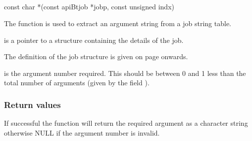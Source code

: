 \subsection{\funcnameXBgetarg{}}

\begin{expara}

const char *\funcnameXBgetarg{}(const apiBtjob *jobp, const unsigned indx)

\end{expara}

The function \funcXBgetarg{} is used to extract an
argument string from a job string table.

 is a pointer to a structure containing the
details of the job.

The definition of the job structure is given on page
\pageref{bkm:Jobstructure} onwards.

 is the argument number required. This should
be between 0 and 1 less than the total number of arguments (given by
the field ).

\subsubsection{Return values}
If successful the function will return the required argument as a
 character string otherwise NULL if the
argument number is invalid.

